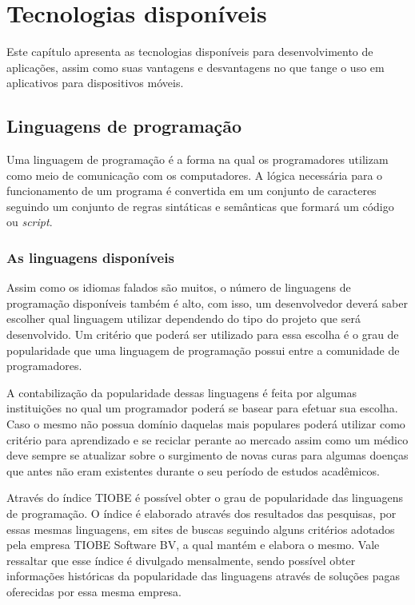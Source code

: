 \chapter{Tecnologias disponíveis} \label{Tecnologias disponíveis}

Este capítulo apresenta as tecnologias disponíveis para desenvolvimento de aplicações, assim como suas vantagens e desvantagens no que tange o uso em aplicativos para dispositivos móveis.

\section{Linguagens de programação}

Uma linguagem de programação é a forma na qual os programadores utilizam como meio de comunicação com os computadores\cite{edirlei2015}. A lógica necessária para o funcionamento de um programa é convertida em um conjunto de caracteres seguindo um conjunto de regras sintáticas e semânticas que formará um código ou \textit{script}.\cite{fischerGrodzinsky1993}

\subsection{As linguagens disponíveis}

Assim como os idiomas falados são muitos, o número de linguagens de programação disponíveis também é alto, com isso, um desenvolvedor deverá saber escolher qual linguagem utilizar dependendo do tipo do projeto que será desenvolvido. Um critério que poderá ser utilizado para essa escolha é o grau de popularidade que uma linguagem de programação possui entre a comunidade de programadores.

A contabilização da popularidade dessas linguagens é feita por algumas instituições no qual um programador poderá se basear para efetuar sua escolha. Caso o mesmo não possua domínio daquelas mais populares poderá utilizar como critério para aprendizado e se reciclar perante ao mercado assim como um médico deve sempre se atualizar sobre o surgimento de novas curas para algumas doenças que antes não eram existentes durante o seu período de estudos acadêmicos.

Através do índice TIOBE\cite{tiobeDefinition} é possível obter o grau de popularidade das linguagens de programação. O índice é elaborado através dos resultados das pesquisas, por essas mesmas linguagens, em sites de buscas seguindo alguns critérios adotados pela empresa TIOBE Software BV\cite{tiobeAbout}, a qual mantém e elabora o mesmo. Vale ressaltar que esse índice é divulgado mensalmente, sendo possível obter informações históricas da popularidade das linguagens através de soluções pagas oferecidas por essa mesma empresa.

